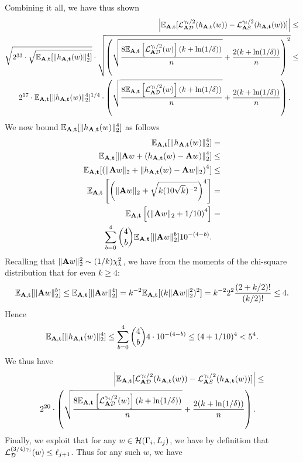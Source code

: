Combining it all, we have thus shown
\begin{align*}
\left|\mathbb{E}_{\mathbf{A},\mathbf{t}} [\mathcal{L}^{\gamma_i/2}_{\mathbf{A} \mathcal{D}}(h_{\mathbf{A},\mathbf{t}}(w)) - \mathcal{L}^{\gamma_i/2}_{\mathbf{A} S}(h_{\mathbf{A},\mathbf{t}}(w))]\right| &\leq \\
\sqrt{2^{33} \cdot \sqrt{\mathbb{E}_{\mathbf{A},\mathbf{t}}[\|h_{\mathbf{A},\mathbf{t}}(w)\|_2^4]}} \cdot \sqrt{\left(\sqrt{\frac{8\mathbb{E}_{\mathbf{A},\mathbf{t}}\left[\mathcal{L}_{\mathbf{A} \mathcal{D}}^{\gamma_i/2}(w)\right] (k + \ln(1/\delta))}{n}} + \frac{2 (k + \ln(1/\delta))}{n} \right)^2} &\leq \\
2^{17} \cdot \mathbb{E}_{\mathbf{A},\mathbf{t}}[\|h_{\mathbf{A},\mathbf{t}}(w)\|_2^4]^{1/4} \cdot \left(\sqrt{\frac{8\mathbb{E}_{\mathbf{A},\mathbf{t}}\left[\mathcal{L}_{\mathbf{A} \mathcal{D}}^{\gamma_i/2}(w)\right] (k + \ln(1/\delta))}{n}} + \frac{2 (k + \ln(1/\delta))}{n} \right).
\end{align*}
We now bound $\mathbb{E}_{\mathbf{A},\mathbf{t}}[\|h_{\mathbf{A},\mathbf{t}}(w)\|_2^4]$ as follows
\begin{align*}
\mathbb{E}_{\mathbf{A},\mathbf{t}}[\|h_{\mathbf{A},\mathbf{t}}(w)\|_2^4] &= \\
\mathbb{E}_{\mathbf{A},\mathbf{t}}[\|\mathbf{A} w + (h_{\mathbf{A},\mathbf{t}}(w)-\mathbf{A} w)\|_2^4] &\leq \\
\mathbb{E}_{\mathbf{A},\mathbf{t}}[\left(\|\mathbf{A} w\|_2 + \|h_{\mathbf{A},\mathbf{t}}(w)-\mathbf{A} w\|_2\right)^4] &\leq\\
\mathbb{E}_{\mathbf{A},\mathbf{t}}\left[\left(\|\mathbf{A} w\|_2 + \sqrt{k (10\sqrt{k})^{-2}}\right)^4\right] &=\\
\mathbb{E}_{\mathbf{A},\mathbf{t}}\left[\left(\|\mathbf{A} w\|_2 + 1/10\right)^4\right] &=\\
\sum_{b=0}^4 \binom{4}{b} \mathbb{E}_{\mathbf{A},\mathbf{t}}[\|\mathbf{A} w\|_2^b] 10^{-(4-b)}.
\end{align*}
Recalling that $\|\mathbf{A} w\|_2^2 \sim (1/k)\chi_k^2$, we have from the moments of the chi-square distribution that for even $k \geq 4$:
\[
\mathbb{E}_{\mathbf{A},\mathbf{t}}[\|\mathbf{A} w\|_2^b] \leq \mathbb{E}_{\mathbf{A},\mathbf{t}}[\|\mathbf{A} w\|_2^4] =k^{-2}\mathbb{E}_{\mathbf{A},\mathbf{t}}[(k\|\mathbf{A} w\|_2^2)^2] = k^{-2} 2^2 \frac{(2 + k/2)!}{(k/2)!} \leq 4.
\]
Hence
\begin{align*}
\mathbb{E}_{\mathbf{A},\mathbf{t}}[\|h_{\mathbf{A},\mathbf{t}}(w)\|_2^4] \leq
\sum_{b=0}^4 \binom{4}{b} 4 \cdot 10^{-(4-b)} \leq (4 + 1/10)^4 < 5^4.
\end{align*}
We thus have
\begin{align*}
\left|\mathbb{E}_{\mathbf{A},\mathbf{t}} [\mathcal{L}^{\gamma_i/2}_{\mathbf{A} \mathcal{D}}(h_{\mathbf{A},\mathbf{t}}(w)) - \mathcal{L}^{\gamma_i/2}_{\mathbf{A} S}(h_{\mathbf{A},\mathbf{t}}(w))]\right| &\leq \\
2^{20} \cdot \left(\sqrt{\frac{8\mathbb{E}_{\mathbf{A},\mathbf{t}}\left[\mathcal{L}_{\mathbf{A} \mathcal{D}}^{\gamma_i/2}(w)\right] (k + \ln(1/\delta))}{n}} + \frac{2 (k + \ln(1/\delta))}{n} \right).
\end{align*}
Finally, we exploit that for any $w \in \mathcal{H}(\Gamma_i, L_j)$, we have by definition that $\mathcal{L}_{\mathcal{D}}^{(3/4)\gamma_{i}}(w)\leq \ell_{j+1}$. Thus for any such $w$, we have

